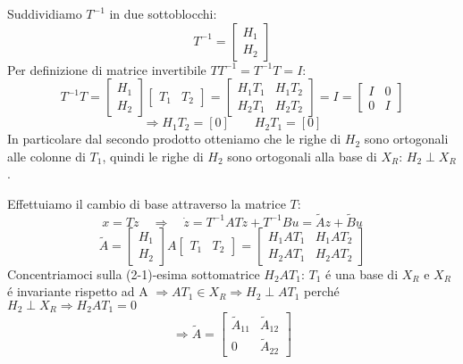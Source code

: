 \documentclass[../main.tex]{subfiles}
\begin{document}
		Suddividiamo $ T^{-1} $ in due sottoblocchi:
		\[
			T^{-1} =
			\begin{bmatrix}
				H_1\\
				H_2
			\end{bmatrix}
		\]
		Per definizione di matrice invertibile $ T T^{-1} = T^{-1} T = I $:
		\[
			T^{-1} T =
			\begin{bmatrix}
				H_1\\
				H_2
			\end{bmatrix}
			\begin{bmatrix}
				T_1 & T_2
			\end{bmatrix} =
			\begin{bmatrix}
				H_1 T_1 & H_1 T_2\\
				H_2 T_1 & H_2 T_2 
			\end{bmatrix} = I =
			\begin{bmatrix}
				I & 0\\
				0 & I
			\end{bmatrix}
		\]
		\[ \Rightarrow H_1 T_2 = [0] \qquad H_2 T_1 = [0] \]
		In particolare dal secondo prodotto otteniamo che le righe di $ H_2 $ sono ortogonali alle colonne di $ T_1 $, quindi le righe di $ H_2 $ sono ortogonali alla base di $ X_R $: $ H_2 \perp X_R $.
		\newline
		
		Effettuiamo il cambio di base attraverso la matrice $ T $:
		\[ x = Tz \quad\Rightarrow\quad \dot z = T^{-1}AT z + T^{-1} B u = \tilde A z + \tilde B u \]
		\[
			\tilde A =
			\begin{bmatrix}
				H_1\\
				H_2
			\end{bmatrix} A
			\begin{bmatrix}
				T_1 & T_2
			\end{bmatrix} =
			\begin{bmatrix}
				H_1 A T_1 & H_1 A T_2\\
				H_2 A T_1 & H_2 A T_2
			\end{bmatrix}
		\]
		Concentriamoci sulla (2-1)-esima sottomatrice $ H_2 A T_1 $: $ T_1 $ \'e una base di $ X_R $ e $ X_R $ \'e invariante rispetto ad A $ \Rightarrow AT_1 \in X_R \Rightarrow H_2 \perp AT_1 $ perch\'e $ H_2 \perp X_R \Rightarrow H_2 A T_1 = 0 $
		\[
			\Rightarrow \tilde A = \begin{bmatrix}
				\tilde A_{11} & \tilde A_{12}\\
				0 & \tilde A_{22}
			\end{bmatrix}
		\]
		
\end{document}

